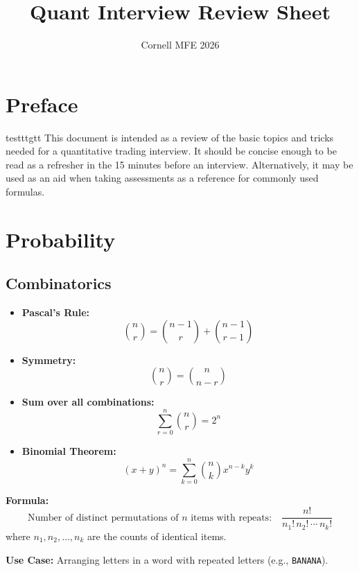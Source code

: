 \documentclass{article}
\title{Quant Interview Review Sheet}
\author{Cornell MFE 2026}
\begin{document}
\maketitle
\tableofcontents

\section{Preface}
testttgtt
This document is intended as a review of the basic topics and tricks needed for a quantitative trading interview. It should be concise enough to be read as a refresher in the 15 minutes before an interview. Alternatively, it may be used as an aid when taking assessments as a reference for commonly used formulas.

\newpage

\section{Probability}
\subsection{Combinatorics}

\begin{tcolorbox}[title=Useful Combinatorics Identities]
\begin{itemize}
  \item \textbf{Pascal's Rule:}
  \[
  \binom{n}{r} = \binom{n-1}{r} + \binom{n-1}{r-1}
  \]

  \item \textbf{Symmetry:}
  \[
  \binom{n}{r} = \binom{n}{n - r}
  \]

  \item \textbf{Sum over all combinations:}
  \[
  \sum_{r=0}^{n} \binom{n}{r} = 2^n
  \]

  \item \textbf{Binomial Theorem:}
  \[
  (x + y)^n = \sum_{k=0}^{n} \binom{n}{k} x^{n-k} y^k
  \]
\end{itemize}
\end{tcolorbox}

\begin{tcolorbox}[title=Permutations with Identical Items]
\textbf{Formula:}
\[
\text{Number of distinct permutations of } n \text{ items with repeats:} \quad
\frac{n!}{n_1! \, n_2! \, \cdots \, n_k!}
\]
where \( n_1, n_2, \ldots, n_k \) are the counts of identical items.

\textbf{Use Case:} Arranging letters in a word with repeated letters (e.g., \texttt{BANANA}).

\end{tcolorbox}
\end{document}

